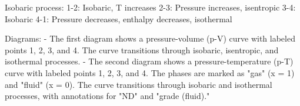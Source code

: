 Isobaric process:  
1-2: Isobaric, T increases  
2-3: Pressure increases, isentropic  
3-4: Isobaric  
4-1: Pressure decreases, enthalpy decreases, isothermal  

Diagrams:  
- The first diagram shows a pressure-volume (p-V) curve with labeled points 1, 2, 3, and 4. The curve transitions through isobaric, isentropic, and isothermal processes.  
- The second diagram shows a pressure-temperature (p-T) curve with labeled points 1, 2, 3, and 4. The phases are marked as "gas" (x = 1) and "fluid" (x = 0). The curve transitions through isobaric and isothermal processes, with annotations for "ND" and "grade (fluid)."
